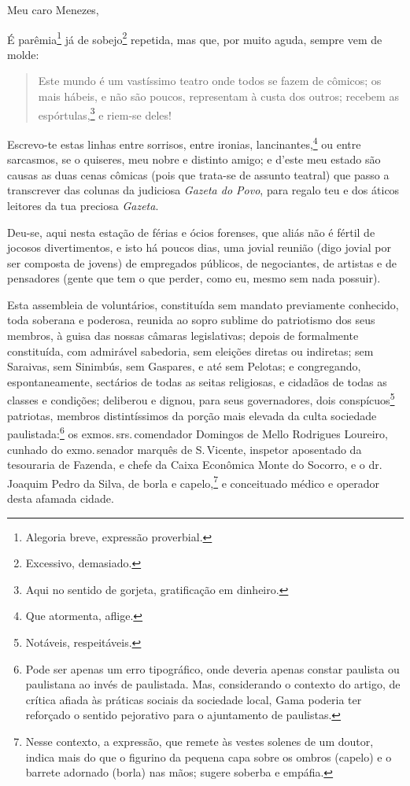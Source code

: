 {Meu caro Menezes,

É parêmia\footnote{Alegoria breve, expressão proverbial.} já de
sobejo\footnote{Excessivo, demasiado.} repetida, mas que, por muito
aguda, sempre vem de molde:

\begin{quote}
Este mundo é um vastíssimo teatro onde todos se fazem de cômicos; os
mais hábeis, e não são poucos, representam à custa dos outros; recebem
as espórtulas,\footnote{Aqui no sentido de gorjeta, gratificação em
  dinheiro.} e riem-se deles!
\end{quote}

Escrevo-te estas linhas entre sorrisos, entre ironias,
lancinantes,\footnote{Que atormenta, aflige.} ou entre sarcasmos, se o
quiseres, meu nobre e distinto amigo; e d'este meu estado são
causas as duas cenas cômicas (pois que trata-se de assunto
teatral) que passo a transcrever das colunas da judiciosa \emph{Gazeta
do Povo}, para regalo teu e dos áticos leitores da tua preciosa
\emph{Gazeta}.

Deu-se, aqui nesta estação de férias e ócios forenses, que aliás não é
fértil de jocosos divertimentos, e isto há poucos dias, uma jovial
reunião (digo jovial por ser composta de jovens) de empregados públicos,
de negociantes, de artistas e de pensadores (gente que tem o que
perder, como eu, mesmo sem nada possuir).

Esta assembleia de voluntários, constituída sem mandato previamente
conhecido, toda soberana e poderosa, reunida ao sopro sublime do
patriotismo dos seus membros, à guisa das nossas câmaras legislativas;
depois de formalmente constituída, com admirável sabedoria, sem eleições
diretas ou indiretas; sem Saraivas, sem Sinimbús, sem Gaspares, e até
sem Pelotas; e congregando, espontaneamente, sectários de todas as seitas
religiosas, e cidadãos de todas as classes e condições; deliberou e
dignou, para seus governadores, dois conspícuos\footnote{Notáveis,
  respeitáveis.} patriotas, membros distintíssimos da porção mais
elevada da culta sociedade paulistada:\footnote{Pode ser apenas um erro
  tipográfico, onde deveria apenas constar paulista ou paulistana ao
  invés de paulistada. Mas, considerando o contexto do artigo, de
  crítica afiada às práticas sociais da sociedade local, Gama poderia
  ter reforçado o sentido pejorativo para o ajuntamento de paulistas.}
os exmos.\,srs.\,comendador Domingos de Mello Rodrigues Loureiro, cunhado
do exmo.\,senador marquês de S.\,Vicente, inspetor aposentado da
tesouraria de Fazenda, e chefe da Caixa Econômica Monte do Socorro, e o
dr.\,Joaquim Pedro da Silva, de borla e capelo,\footnote{Nesse contexto, a expressão, que
  remete às vestes solenes de um doutor, indica mais do
  que o figurino da pequena capa sobre os ombros (capelo) e o barrete
  adornado (borla) nas mãos; sugere soberba e empáfia.} e conceituado
médico e operador desta afamada cidade.

}
